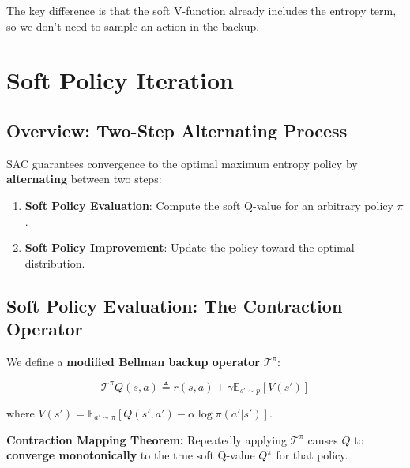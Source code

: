 \documentclass[12pt,a4paper]{article}
\theoremstyle{noteplain}
\theoremstyle{noteexercise}
\begin{document}
The key difference is that the soft V-function already includes the entropy term, so we don't need to sample an action in the backup.






\section{Soft Policy Iteration}\label{sec:spi}



\subsection{Overview: Two-Step Alternating Process}\label{ssec:spi-overview}



SAC guarantees convergence to the optimal maximum entropy policy by \textbf{alternating} between two steps:

\begin{enumerate}
  \setlength{\itemsep}{0.3em}
  \item \textbf{Soft Policy Evaluation}: Compute the soft Q-value for an arbitrary policy $\pi$.
  \item \textbf{Soft Policy Improvement}: Update the policy toward the optimal distribution.
\end{enumerate}



\subsection{Soft Policy Evaluation: The Contraction Operator}\label{ssec:contraction}



We define a \textbf{modified Bellman backup operator} $\mathcal{T}^\pi$:

\begin{equation}\label{eq:contraction}
\boxed{\mathcal{T}^\pi Q(s,a) \triangleq r(s,a) + \gamma \mathbb{E}_{s' \sim p}[V(s')]}
\end{equation}

where $V(s') = \mathbb{E}_{a' \sim \pi}[Q(s', a') - \alpha \log\pi(a'|s')]$.

\textbf{Contraction Mapping Theorem:} Repeatedly applying $\mathcal{T}^\pi$ causes $Q$ to \textbf{converge monotonically} to the true soft Q-value $Q^\pi$ for that policy.
\end{document}
